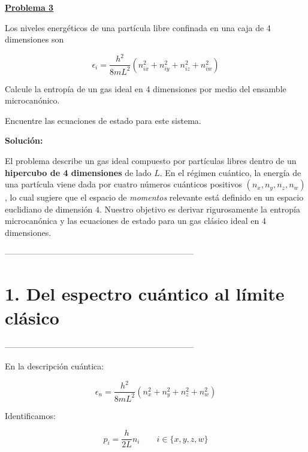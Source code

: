 \documentclass{article}
\newenvironment{AGbox}[1][7]%
{%
  \begin{tcolorbox}[
    enhanced, breakable,
    colframe=AppleGreen,
    colback=AppleGreen!#1,
    boxrule=1pt,
    borderline west={2mm}{-10mm}{AppleGreen},
    sharp corners=southwest,
    left=14pt,right=14pt,top=10pt,bottom=10pt,
     boxsep=6pt,
  ]%
}{%
  \end{tcolorbox}%
}
\begin{document}


\begin{AGbox}[8]
\textcolor{Apple Green}{\textbf{\underline{Problema 3}}} \vspace{2mm}

Los niveles energéticos de una partícula libre confinada en una caja de 4 dimensiones son

\[
\epsilon_{i}
= \frac{h^{2}}{8 m L^{2}}
  \left( n_{ix}^{2} + n_{iy}^{2} + n_{iz}^{2} + n_{iw}^{2} \right)
\]

Calcule la entropía de un gas ideal en 4 dimensiones por medio del  
ensamble microcanónico.  

Encuentre las ecuaciones de estado para este sistema.

\end{AGbox}
\vspace{0.5cm}

\textcolor{Tuscany}{\textbf{Solución:}}

El problema describe un gas ideal compuesto por partículas libres dentro de un
\textbf{hipercubo de 4 dimensiones} de lado \(L\). En el régimen cuántico, la energía
de una partícula viene dada por cuatro números cuánticos positivos
\((n_{x},n_{y},n_{z},n_{w})\), lo cual sugiere que el espacio de \emph{momentos} 
relevante está definido en un espacio euclidiano de dimensión \(4\). Nuestro objetivo
es derivar rigurosamente la entropía microcanónica y las ecuaciones de estado para
un gas clásico ideal en \(4\) dimensiones.

--------------------------------------------------------------------
\section*{\textcolor{Apple Green}{1. Del espectro cuántico al límite clásico}}
--------------------------------------------------------------------

En la descripción cuántica:

\[
\epsilon_{n}
= \frac{h^{2}}{8mL^{2}}\left(n_{x}^{2}+n_{y}^{2}+n_{z}^{2}+n_{w}^{2}\right)
\]

Identificamos:

\[
p_{i}
= \frac{h}{2L}n_{i}
\qquad i \in \{x,y,z,w\}
\]
\end{document}
